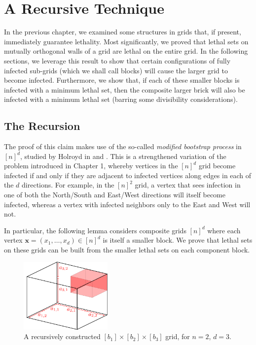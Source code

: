 \chapter{A Recursive Technique}

In the previous chapter, we examined some structures in grids that, if present, immediately guarantee lethality. Most significantly, we proved that lethal sets on mutually orthogonal walls of a grid are lethal on the entire grid. In the following sections, we leverage this result to show that certain configurations of fully infected sub-grids (which we shall call blocks) will cause the larger grid to become infected. Furthermore, we show that, if each of these smaller blocks is infected with a minimum lethal set, then the composite larger brick will also be infected with a minimum lethal set (barring some divisibility considerations).

\section{The Recursion}

The proof of this claim makes use of the so-called \emph{modified bootstrap process} in $[n]^d$, studied by Holroyd in \cite{holroyd2006metastability} and \cite{holroyd2003sharp}. This is a strengthened variation of the problem introduced in Chapter 1, whereby vertices in the $[n]^d$ grid become infected if and only if they are adjacent to infected vertices along edges in each of the $d$ directions. For example, in the $[n]^2$ grid, a vertex that sees infection in one of both the North/South and East/West directions will itself become infected, whereas a vertex with infected neighbors only to the East and West will not. 

In particular, the following lemma considers composite grids $[n]^d$ where each vertex $\mathbf{x} = (x_1, \dots, x_d) \in [n]^d$ is itself a smaller block. We prove that lethal sets on these grids can be built from the smaller lethal sets on each component block. 

\begin{figure}[]
\centering
\includegraphics[width=0.4\textwidth]{figures/3/recursion.pdf}
\caption{A recursively constructed $[b_1] \times [b_2] \times [b_3]$ grid, for $n = 2$, $d = 3$.}
\label{fig:recursion}
\end{figure} 

